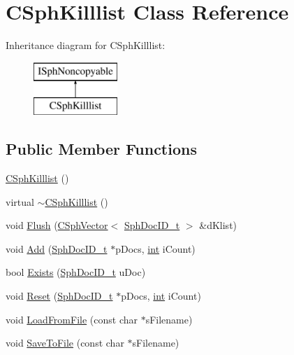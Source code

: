 \hypertarget{classCSphKilllist}{\section{C\-Sph\-Killlist Class Reference}
\label{classCSphKilllist}
}
Inheritance diagram for C\-Sph\-Killlist\-:\begin{figure}[H]
\begin{center}
\leavevmode
\includegraphics[height=2.000000cm]{classCSphKilllist}
\end{center}
\end{figure}
\subsection*{Public Member Functions}
\begin{DoxyCompactItemize}
\item 
\hyperlink{classCSphKilllist_a9844863ca94a8c8a6ffc31a3fb55b9d3}{C\-Sph\-Killlist} ()
\item 
virtual \hyperlink{classCSphKilllist_afb48b2a68cb6f4255933b31e62c6eb2b}{$\sim$\-C\-Sph\-Killlist} ()
\item 
void \hyperlink{classCSphKilllist_ae983b1951e8380fa9fcc4d0cb83b3234}{Flush} (\hyperlink{classCSphVector}{C\-Sph\-Vector}$<$ \hyperlink{sphinx_8h_a3176771631c12a9e4897272003e6b447}{Sph\-Doc\-I\-D\-\_\-t} $>$ \&d\-Klist)
\item 
void \hyperlink{classCSphKilllist_a7ed08570f30cc7c4ea7930175863d15e}{Add} (\hyperlink{sphinx_8h_a3176771631c12a9e4897272003e6b447}{Sph\-Doc\-I\-D\-\_\-t} $\ast$p\-Docs, \hyperlink{sphinxexpr_8cpp_a4a26e8f9cb8b736e0c4cbf4d16de985e}{int} i\-Count)
\item 
bool \hyperlink{classCSphKilllist_a17f76beeacd4a776427e57461f08f1c3}{Exists} (\hyperlink{sphinx_8h_a3176771631c12a9e4897272003e6b447}{Sph\-Doc\-I\-D\-\_\-t} u\-Doc)
\item 
void \hyperlink{classCSphKilllist_af8fb1e66cbf7d943dfe964f652033b2d}{Reset} (\hyperlink{sphinx_8h_a3176771631c12a9e4897272003e6b447}{Sph\-Doc\-I\-D\-\_\-t} $\ast$p\-Docs, \hyperlink{sphinxexpr_8cpp_a4a26e8f9cb8b736e0c4cbf4d16de985e}{int} i\-Count)
\item 
void \hyperlink{classCSphKilllist_ac5158514bd693f77f22533010776f663}{Load\-From\-File} (const char $\ast$s\-Filename)
\item 
void \hyperlink{classCSphKilllist_ab2e821e2cd02c12372be7b0812f0279a}{Save\-To\-File} (const char $\ast$s\-Filename)
\end{DoxyCompactItemize}
